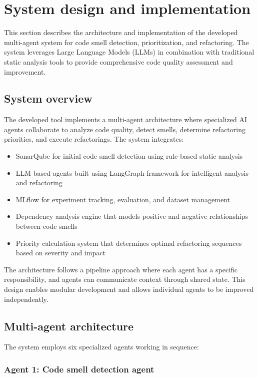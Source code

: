\section{System design and implementation}
\label{sec:system-design}

This section describes the architecture and implementation of the developed multi-agent system for code smell detection, prioritization, and refactoring. The system leverages Large Language Models (LLMs) in combination with traditional static analysis tools to provide comprehensive code quality assessment and improvement.

\subsection{System overview}

The developed tool implements a multi-agent architecture where specialized AI agents collaborate to analyze code quality, detect smells, determine refactoring priorities, and execute refactorings. The system integrates:

\begin{itemize}
    \item SonarQube for initial code smell detection using rule-based static analysis
    \item LLM-based agents built using LangGraph framework for intelligent analysis and refactoring
    \item MLflow for experiment tracking, evaluation, and dataset management
    \item Dependency analysis engine that models positive and negative relationships between code smells
    \item Priority calculation system that determines optimal refactoring sequences based on severity and impact
\end{itemize}

The architecture follows a pipeline approach where each agent has a specific responsibility, and agents can communicate context through shared state. This design enables modular development and allows individual agents to be improved independently.

\subsection{Multi-agent architecture}

The system employs six specialized agents working in sequence:

\subsubsection{Agent 1: Code smell detection agent}

